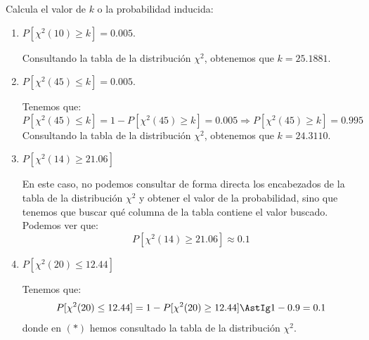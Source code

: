 \begin{ejemplo}
    Calcula el valor de $k$ o la probabilidad inducida:
    \begin{enumerate}[label=\alph*)]
        \item $P[\chi^2(10)\geq k] = 0.005$.

            Consultando la tabla de la distribución $\chi^2$, obtenemos que $k = 25.1881$.
        \item $P[\chi^2(45) \leq k] = 0.005$.
        
            Tenemos que:
            \begin{equation*}
                P[\chi^2(45) \leq k] = 1-P[\chi^2(45) \geq k] = 0.005 \Longrightarrow
                P[\chi^2(45) \geq k] = 0.995
            \end{equation*}
            Consultando la tabla de la distribución $\chi^2$, obtenemos que $k = 24.3110$.
        
        \item $P[\chi^2(14) \geq 21.06]$
        
            En este caso, no podemos consultar de forma directa los encabezados de la tabla de la distribución $\chi^2$ y obtener el valor de la probabilidad, sino que tenemos que buscar qué columna de la tabla contiene el valor buscado. Podemos ver que:
            \begin{equation*}
                P[\chi^2(14) \geq 21.06] \approx 0.1
            \end{equation*}
            
        \item $P[\chi^2(20) \leq 12.44]$
        
            Tenemos que:
            \begin{equation*}
                P[\chi^2(20) \leq 12.44] = 1-P[\chi^2(20) \geq 12.44] \AstIg 1-0.9 = 0.1
            \end{equation*}
            donde en $(\ast)$ hemos consultado la tabla de la distribución $\chi^2$.
    \end{enumerate}
\end{ejemplo}

